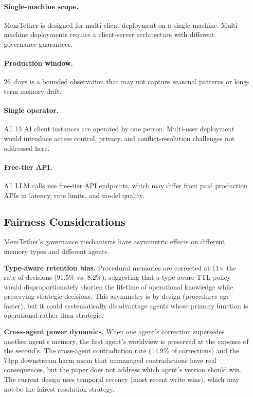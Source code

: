 \documentclass{article}
\begin{document}
\paragraph{Single-machine scope.} MemTether is designed for multi-client deployment on a single machine. Multi-machine deployments require a client-server architecture with different governance guarantees.
\paragraph{Production window.} 26~days is a bounded observation that may not capture seasonal patterns or long-term memory drift.
\paragraph{Single operator.} All 15 AI client instances are operated by one person. Multi-user deployment would introduce access control, privacy, and conflict-resolution challenges not addressed here.
\paragraph{Free-tier API.} All LLM calls use free-tier API endpoints, which may differ from paid production APIs in latency, rate limits, and model quality.

\subsection{Fairness Considerations}

MemTether's governance mechanisms have asymmetric effects on different memory types and different agents.

\textbf{Type-aware retention bias.} Procedural memories are corrected at 11$\times$ the rate of decisions (91.5\% vs. 8.2\%), suggesting that a type-aware TTL policy would disproportionately shorten the lifetime of operational knowledge while preserving strategic decisions. This asymmetry is by design (procedures age faster), but it could systematically disadvantage agents whose primary function is operational rather than strategic.

\textbf{Cross-agent power dynamics.} When one agent's correction supersedes another agent's memory, the first agent's worldview is preserved at the expense of the second's. The cross-agent contradiction rate (14.9\% of corrections) and the 73pp downstream harm mean that unmanaged contradictions have real consequences, but the paper does not address which agent's version should win. The current design uses temporal recency (most recent write wins), which may not be the fairest resolution strategy.
\end{document}
